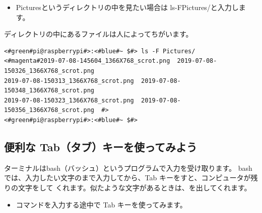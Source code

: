 \documentclass[text03.tex]{subfiles}
\begin{document}
\begin{itemize}
  \item[<例>] Picturesというディレクトリの中を見たい場合は ls\textvisiblespace -F\textvisiblespace Pictures/と入力します。
\end{itemize}

ディレクトリの中にあるファイルは人によってちがいます。
\begin{lstlisting}[caption=ls -F Pictures/コマンドの例,label=lsFPicttest]
<#green#pi@raspberrypi#>:<#blue#~ $#> ls -F Pictures/
<#magenta#2019-07-08-145604_1366X768_scrot.png  2019-07-08-150326_1366X768_scrot.png
2019-07-08-150313_1366X768_scrot.png  2019-07-08-150348_1366X768_scrot.png
2019-07-08-150323_1366X768_scrot.png  2019-07-08-150356_1366X768_scrot.png  #>
<#green#pi@raspberrypi#>:<#blue#~ $#>
\end{lstlisting}

\subsection{便利な Tab（タブ）キーを使ってみよう}
ターミナルはbash（バッシュ）というプログラムで入力を受け取ります。
bashでは、入力したい文字のまで入力してから、Tab キーをすと、コンピュータが残りの文字をして
くれます。似たような文字があるときは、を出してくれます。
\newpage
\begin{itemize}
\item[<例>]コマンドを入力する途中で Tab キーを使ってみます。
\end{itemize}
\end{document}
